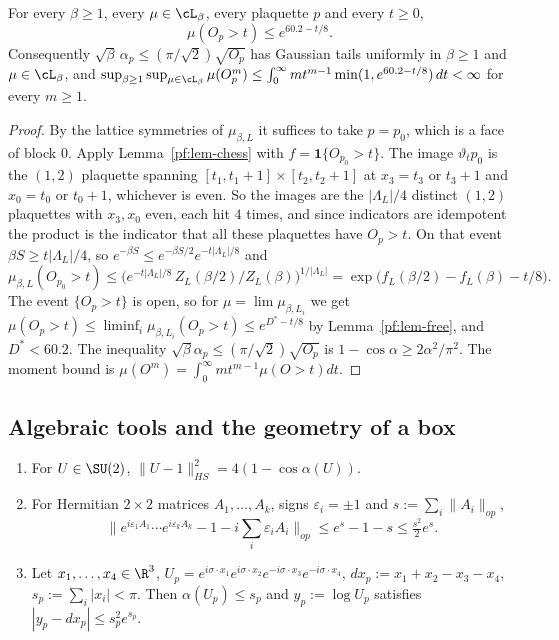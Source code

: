 \begin{corollary}\label{pf:cor-tail}
For every $\beta\ge1$, every $\mu\in\cL_\beta$, every plaquette $p$ and every $t\ge0$,
\[
\mu(O_p>t)\le e^{60.2-t/8}.
\]
Consequently $\sqrt\beta\,\alpha_p\le(\pi/\sqrt2)\sqrt{O_p}$ has Gaussian tails uniformly in $\beta\ge1$ and $\mu\in\cL_\beta$, and $\sup_{\beta\ge1}\sup_{\mu\in\cL_\beta}\mu(O_p^m)\le\int_0^\infty mt^{m-1}\min(1,e^{60.2-t/8})\,dt<\infty$ for every $m\ge1$.
\end{corollary}

\begin{proof}
By the lattice symmetries of $\mu_{\beta,L}$ it suffices to take $p=p_0$, which is a face of block $0$. Apply Lemma~\ref{pf:lem-chess} with $f=\mathbf 1\{O_{p_0}>t\}$. The image $\vartheta_tp_0$ is the $(1,2)$ plaquette spanning $[t_1,t_1+1]\times[t_2,t_2+1]$ at $x_3=t_3$ or $t_3+1$ and $x_0=t_0$ or $t_0+1$, whichever is even. So the images are the $|\Lambda_L|/4$ distinct $(1,2)$ plaquettes with $x_3,x_0$ even, each hit $4$ times, and since indicators are idempotent the product is the indicator that all these plaquettes have $O_p>t$. On that event $\beta S\ge t|\Lambda_L|/4$, so $e^{-\beta S}\le e^{-\beta S/2}e^{-t|\Lambda_L|/8}$ and
\[
\mu_{\beta,L}(O_{p_0}>t)\le\Big(e^{-t|\Lambda_L|/8}\,Z_L(\beta/2)/Z_L(\beta)\Big)^{1/|\Lambda_L|}=\exp\big(f_L(\beta/2)-f_L(\beta)-t/8\big).
\]
The event $\{O_p>t\}$ is open, so for $\mu=\lim\mu_{\beta,L_i}$ we get $\mu(O_p>t)\le\liminf_i\mu_{\beta,L_i}(O_p>t)\le e^{D^*-t/8}$ by Lemma~\ref{pf:lem-free}, and $D^*<60.2$. The inequality $\sqrt\beta\alpha_p\le(\pi/\sqrt2)\sqrt{O_p}$ is $1-\cos\alpha\ge2\alpha^2/\pi^2$. The moment bound is $\mu(O^m)=\int_0^\infty mt^{m-1}\mu(O>t)dt$.
\end{proof}

\subsection{Algebraic tools and the geometry of a box}\label{pf:sec-box}

\begin{lemma}\label{pf:lem-E}
\leavevmode
\begin{enumerate}
\item[(E1)] For $U\in\SU(2)$, $\|U-1\|_{HS}^2=4(1-\cos\alpha(U))$.
\item[(E2)] For Hermitian $2\times2$ matrices $A_1,\dots,A_k$, signs $\varepsilon_i=\pm1$ and $s:=\sum_i\|A_i\|_{op}$,
\[\big\|e^{i\varepsilon_1A_1}\cdots e^{i\varepsilon_kA_k}-1-i\textstyle\sum_i\varepsilon_iA_i\big\|_{op}\le e^s-1-s\le\tfrac{s^2}2e^s.\]
\item[(E3)] Let $x_1,\dots,x_4\in\R^3$, $U_p=e^{i\sigma\cdot x_1}e^{i\sigma\cdot x_2}e^{-i\sigma\cdot x_3}e^{-i\sigma\cdot x_4}$, $dx_p:=x_1+x_2-x_3-x_4$, $s_p:=\sum_i|x_i|<\pi$. Then $\alpha(U_p)\le s_p$ and $y_p:=\log U_p$ satisfies $|y_p-dx_p|\le s_p^2e^{s_p}$.
\end{enumerate}
\end{lemma}

